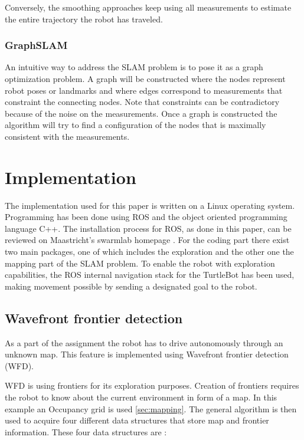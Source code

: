 \documentclass{ba-kecs}
\begin{document}
Conversely, the smoothing approaches keep using all measurements to estimate the entire trajectory the robot has traveled.

\subsubsection{GraphSLAM}
An intuitive way to address the SLAM problem is to pose it as a graph optimization problem. A graph will be constructed where the nodes represent robot poses or landmarks and where edges correspond to measurements that constraint the connecting nodes. Note that constraints can be contradictory because of the noise on the measurements. Once a graph is constructed the algorithm will try to find a configuration of the nodes that is maximally consistent with the measurements.

\section{Implementation}

The implementation used for this paper is written on a Linux operating system. Programming has been done using ROS and the object oriented programming language C++. The installation process for ROS, as done in this paper, can be reviewed on Maastricht's swarmlab homepage \cite{swarmlab}.
 For the coding part there exist two main packages, one of which includes the exploration and the other one the mapping part of the SLAM problem. To enable the robot with exploration capabilities, the ROS internal navigation stack for the TurtleBot has been used, making movement possible by sending a designated goal to the robot.

\subsection{Wavefront frontier detection}

As a part of the assignment the robot has to drive autonomously through an unknown map. This feature is implemented using Wavefront frontier detection (WFD).

WFD is using frontiers for its exploration purposes. Creation of frontiers requires the robot to know about the current environment in form of a map. In this example an Occupancy grid is used \ref{sec:mapping}. The general algorithm is then used to acquire four different data structures that store map and frontier information. These four data structures are :
\end{document}
